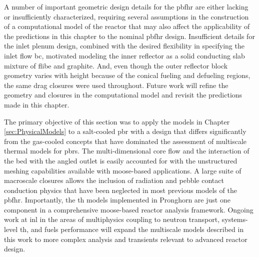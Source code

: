 A number of important geometric design details for the \gls{pbfhr} are either lacking or insufficiently characterized, requiring several assumptions in the construction of a computational model of the reactor that may also affect the applicability of the predictions in this chapter to the nominal \gls{pbfhr} design. Insufficient details for the inlet plenum design, combined with the desired flexibility in specifying the inlet flow \gls{bc}, motivated modeling the inner reflector as a solid conducting slab mixture of \gls{flibe} and graphite. And, even though the outer reflector block geometry varies with height because of the conical fueling and defueling regions, the same drag closures were used throughout. Future work will refine the geometry and closures in the computational model and revisit the predictions made in this chapter.

The primary objective of this section was to apply the models in Chapter \ref{sec:PhysicalModels} to a salt-cooled \gls{pbr} with a design that differs significantly from the gas-cooled concepts that have dominated the assessment of multiscale thermal models for \glspl{pbr}. The multi-dimensional core flow and the interaction of the bed with the angled outlet is easily accounted for with the unstructured meshing capabilities available with \gls{moose}-based applications. A large suite of macroscale closures allows the inclusion of radiation and pebble contact conduction physics that have been neglected in most previous models of the \gls{pbfhr}. Importantly, the \gls{th} models implemented in Pronghorn are just one component in a comprehensive \gls{moose}-based reactor analysis framework. Ongoing work at \gls{inl} in the areas  of multiphysics coupling to neutron transport, systems-level \gls{th}, and fuels performance will expand the multiscale models described in this work to more complex analysis and transients relevant to advanced reactor design.
